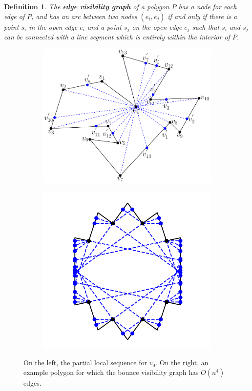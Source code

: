 \documentclass[sageh,times,Review]{sagej}
\newtheorem{definition}{Definition}
\begin{document}
\begin{definition}
The \textbf{edge visibility graph} of a polygon $P$ has a node for each edge of
$P$, and has an arc between two nodes $(e_i, e_j)$ if and only if there is a
point $s_i$ in the open edge $e_i$ and a point $s_j$ on the open edge $e_j$ such
that $s_i$ and $s_j$ can be connected with a line segment which is entirely
within the interior of $P$.
\end{definition}


\begin{figure}[h]
\centering
\begin{subfigure}{0.5\columnwidth}
    \centering
    \includegraphics[width=\linewidth]{tikz1.pdf}
\end{subfigure}%
\begin{subfigure}{0.5\columnwidth}
    \centering
    \includegraphics[width=\linewidth]{chestnut_5.pdf}
\end{subfigure}
\centering
\caption{On the left, the partial local sequence for $v_0$. On the right, an example polygon for which the bounce visibility graph has
$O(n^4)$ edges.\label{fig:alg1}}
\end{figure}
\end{document}

